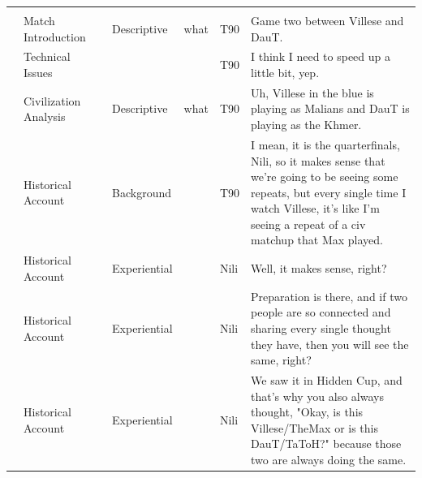 {\begin{longtable}{@{}>{\theAppRow}r|L{2.3cm}L{2.2cm}L{1.4cm}L{2.2cm}L{0.5cm}U{5.6cm}@{}}
    \midrule
     \\
    \endfoot

    \bottomrule
    \endlastfoot
    & Match Introduction    &                      & Descriptive   & what              & T90     & Game two between Villese and DauT.                                                                                                                                                                                       \\
    & Technical Issues      &                      &             &                   & T90     & I think I need to speed up a little bit, yep.                                                                                                                                                                            \\
    & Civilization Analysis &                      & Descriptive   & what              & T90     & Uh, Villese in the blue is playing as Malians and DauT is playing as the Khmer.                                                                                                                                          \\
    & Historical Account    &                      & Background  &                   & T90     & I mean, it is the quarterfinals, Nili, so it makes sense that we're going to be seeing some repeats, but every single time I watch Villese, it's like I'm seeing a repeat of a civ matchup that Max played.              \\
    & Historical Account    &                      & Experiential  &                   & Nili    & Well, it makes sense, right?                                                                                                                                                                                             \\
    & Historical Account    &                      & Experiential &                   & Nili    & Preparation is there, and if two people are so connected and sharing every single thought they have, then you will see the same, right?                                                                                  \\
    & Historical Account    &                      & Experiential &                   & Nili    & We saw it in Hidden Cup, and that's why you also always thought, "Okay, is this Villese/TheMax or is this DauT/TaToH?" because those two are always doing the same.                                                      \\

\end{longtable}}
